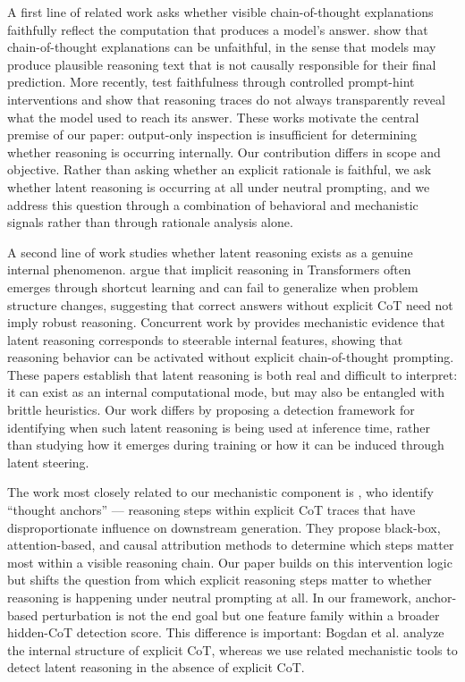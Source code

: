 \documentclass{article}
\theoremstyle{plain}
\theoremstyle{definition}
\theoremstyle{remark}
\begin{document}
A first line of related work asks whether visible chain-of-thought explanations faithfully reflect the computation that produces a model's answer. \citet{turpin_language_2023} show that chain-of-thought explanations can be unfaithful, in the sense that models may produce plausible reasoning text that is not causally responsible for their final prediction. More recently, \citet{chen_reasoning_2025} test faithfulness through controlled prompt-hint interventions and show that reasoning traces do not always transparently reveal what the model used to reach its answer. These works motivate the central premise of our paper: output-only inspection is insufficient for determining whether reasoning is occurring internally. Our contribution differs in scope and objective. Rather than asking whether an explicit rationale is faithful, we ask whether latent reasoning is occurring at all under neutral prompting, and we address this question through a combination of behavioral and mechanistic signals rather than through rationale analysis alone.

A second line of work studies whether latent reasoning exists as a genuine internal phenomenon. \citet{lin_implicit_2025} argue that implicit reasoning in Transformers often emerges through shortcut learning and can fail to generalize when problem structure changes, suggesting that correct answers without explicit CoT need not imply robust reasoning. Concurrent work by \citet{he_reasoning_2026} provides mechanistic evidence that latent reasoning corresponds to steerable internal features, showing that reasoning behavior can be activated without explicit chain-of-thought prompting. These papers establish that latent reasoning is both real and difficult to interpret: it can exist as an internal computational mode, but may also be entangled with brittle heuristics. Our work differs by proposing a detection framework for identifying when such latent reasoning is being used at inference time, rather than studying how it emerges during training or how it can be induced through latent steering.

The work most closely related to our mechanistic component is \citet{bogdan_thought_2025}, who identify ``thought anchors'' --- reasoning steps within explicit CoT traces that have disproportionate influence on downstream generation. They propose black-box, attention-based, and causal attribution methods to determine which steps matter most within a visible reasoning chain. Our paper builds on this intervention logic but shifts the question from which explicit reasoning steps matter to whether reasoning is happening under neutral prompting at all. In our framework, anchor-based perturbation is not the end goal but one feature family within a broader hidden-CoT detection score. This difference is important: Bogdan et al. analyze the internal structure of explicit CoT, whereas we use related mechanistic tools to detect latent reasoning in the absence of explicit CoT.
\end{document}

